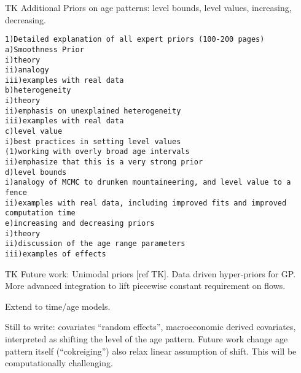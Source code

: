 TK Additional Priors on age patterns: level bounds, level values,
increasing, decreasing.
\begin{verbatim}
1)Detailed explanation of all expert priors (100-200 pages)
a)Smoothness Prior
i)theory
ii)analogy
iii)examples with real data
b)heterogeneity
i)theory
ii)emphasis on unexplained heterogeneity
iii)examples with real data
c)level value
i)best practices in setting level values
(1)working with overly broad age intervals
ii)emphasize that this is a very strong prior
d)level bounds
i)analogy of MCMC to drunken mountaineering, and level value to a
fence
ii)examples with real data, including improved fits and improved
computation time
e)increasing and decreasing priors
i)theory
ii)discussion of the age range parameters
iii)examples of effects
\end{verbatim}


TK Future work: Unimodal priors [ref TK].  Data driven hyper-priors
for GP.  More advanced integration to lift piecewise constant
requirement on flows.

Extend to time/age models.

Still to write: covariates ``random effects'', macroeconomic derived
covariates, interpreted as shifting the level of the age pattern.
Future work change age pattern itself (``cokreiging'') also relax
linear assumption of shift.  This will be computationally challenging.

